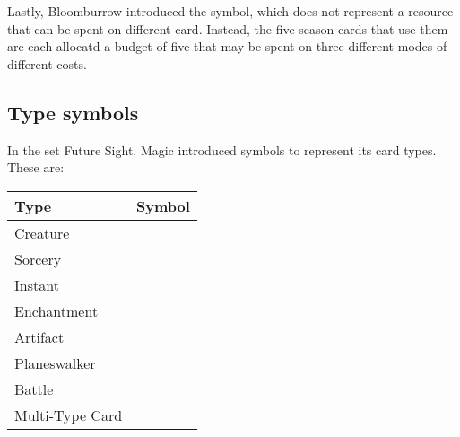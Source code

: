 \documentclass[a4paper]{scrartcl}
\begin{document}
	Lastly, Bloomburrow introduced the \mtgPaw{} symbol, which does not represent a resource that can be spent on different card.
	Instead, the five season cards that use them are each allocatd a budget of five \mtgPawprint{} that may be spent on three different modes of different costs.

	\subsection*{Type symbols}

	In the set Future Sight, Magic introduced symbols to represent its card types.
	These are:
	\begin{table}[h]
		\begin{tabular}{l c}
			\hline
			\textbf{Type} & \textbf{Symbol} \\
			\hline
			Creature & \mtgTypeCreature \\
			Sorcery & \mtgTypeSorcery \\
			Instant & \mtgTypeInstant \\
			Enchantment & \mtgTypeEnchantment \\
			Artifact & \mtgTypeArtifact \\
			Planeswalker & \mtgTypePlaneswalker \\
			Battle & \mtgTypeBattle \\
			Multi-Type Card & \mtgTypeMulti \\
			\hline
		\end{tabular}
	\end{table}
\end{document}
